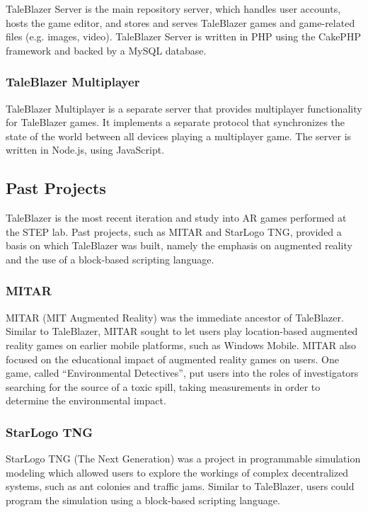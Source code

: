 TaleBlazer Server is the main repository server, which handles user accounts, hosts the game editor, and stores and serves TaleBlazer games and game-related files (e.g. images, video). TaleBlazer Server is written in PHP using the CakePHP framework and backed by a MySQL database. 

\subsubsection{TaleBlazer Multiplayer}

TaleBlazer Multiplayer is a separate server that provides multiplayer functionality for TaleBlazer games. It implements a separate protocol that synchronizes the state of the world between all devices playing a multiplayer game. The server is written in Node.js, using JavaScript.

\subsection{Past Projects}

TaleBlazer is the most recent iteration and study into AR games performed at the STEP lab. Past projects, such as MITAR and StarLogo TNG, provided a basis on which TaleBlazer was built, namely the emphasis on augmented reality and the use of a block-based scripting language.

\subsubsection{MITAR}

MITAR (MIT Augmented Reality) was the immediate ancestor of TaleBlazer. Similar to TaleBlazer, MITAR sought to let users play location-based augmented reality games on earlier mobile platforms, such as Windows Mobile. MITAR also focused on the educational impact of augmented reality games on users. One game, called ``Environmental Detectives'', put users into the roles of investigators searching for the source of a toxic spill, taking measurements in order to determine the environmental impact. \cite{site:ed}

\subsubsection{StarLogo TNG}

StarLogo TNG (The Next Generation) was a project in programmable simulation modeling which allowed users to explore the workings of complex decentralized systems, such as ant colonies and traffic jams. \cite{site:starlogo} Similar to TaleBlazer, users could program the simulation using a block-based scripting language. 

